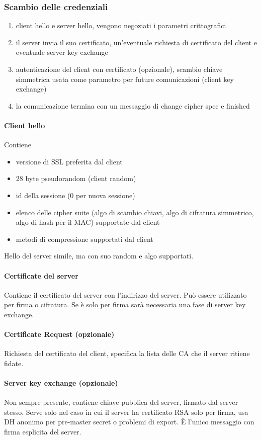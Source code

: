 \documentclass[11pt]{article}
\begin{document}
\subsubsection{Scambio delle credenziali}
\begin{enumerate}
    \item client hello e server hello, vengono negoziati i parametri crittografici
    \item il server invia il suo certificato, un'eventuale richiesta di certificato del client e eventuale server key exchange 
    \item autenticazione del client con certificato (opzionale), scambio chiave simmetrica usata come parametro per future 
    comunicazioni (client key exchange)
    \item la comunicazione termina con un messaggio di change cipher spec e finished
\end{enumerate}
\paragraph*{Client hello}
Contiene
\begin{itemize}
    \item versione di SSL preferita dal client 
    \item 28 byte pseudorandom (client random)
    \item id della sessione (0 per nuova sessione)
    \item elenco delle cipher suite (algo di scambio chiavi, algo di cifratura simmetrico, algo di hash per il MAC) supportate dal client 
    \item metodi di compressione supportati dal client 
\end{itemize}
Hello del server simile, ma con suo random e algo supportati.
\paragraph*{Certificate del server}
Contiene il certificato del server con l'indirizzo del server. Può essere utilizzato per firma o cifratura. Se è solo per 
firma sarà necessaria una fase di server key exchange.
\paragraph*{Certificate Request (opzionale)}
Richiesta del certificato del client, specifica la lista delle CA che il server ritiene fidate.
\paragraph*{Server key exchange (opzionale)}
Non sempre presente, contiene chiave pubblica del server, firmato dal server stesso. Serve solo nel caso in cui il server 
ha certificato RSA solo per firma, usa DH anonimo per pre-master secret o problemi di export. È l'unico messaggio con 
firma esplicita del server.
\end{document}
